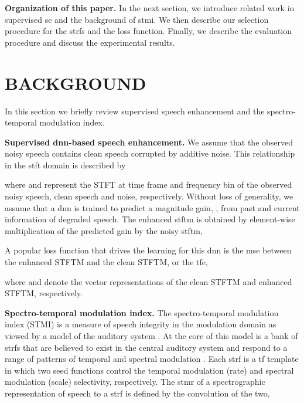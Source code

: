 \documentclass{article}
\begin{document}
\textbf{Organization of this paper.}
In the next section, we introduce related work in supervised \gls{se} and the background of \gls{stmi}. We then describe our selection procedure for the \gls{strf}s and the loss function. Finally, we describe the evaluation procedure and discuss the experimental results.



\section{BACKGROUND}

\label{sec:prior}
In this section we briefly review supervised speech enhancement and the spectro-temporal modulation index.

\textbf{Supervised \gls{dnn}-based speech enhancement.}
We assume that the observed noisy speech contains clean speech corrupted by additive noise. This relationship in the \gls{stft} domain is described by 

where  and  represent the STFT at time frame  and frequency bin  of the observed noisy speech, clean speech and noise, respectively. Without loss of generality, we assume that a \gls{dnn} is trained to predict a magnitude gain, , from past and current information of degraded speech. The enhanced \gls{stftm} is obtained by element-wise multiplication of  the predicted gain by the noisy \gls{stftm},

A popular loss function that drives the learning for this \gls{dnn} is the \gls{mse} between the enhanced STFTM and the clean STFTM, or the \gls{tfe},

where  and  denote the vector representations of the clean STFTM and enhanced STFTM, respectively.

\textbf{Spectro-temporal modulation index.}
The spectro-temporal modulation index (STMI) is a measure of speech integrity in the modulation domain as viewed by a model of the auditory system \cite{elhilaliSpectrotemporalModulationIndex2003}. At the core of this model is a bank of \gls{strf}s that are believed to exist in the central auditory system and respond to a range of patterns of temporal and spectral modulation \cite{chiMultiresolutionSpectrotemporalAnalysis2005}.  Each \gls{strf} is a \gls{tf} template in which two seed functions control the temporal modulation (rate) and spectral modulation (scale) selectivity, respectively. The \gls{stmr} of a spectrographic representation of speech to a \gls{strf} is defined by the convolution of the two,
\end{document}
